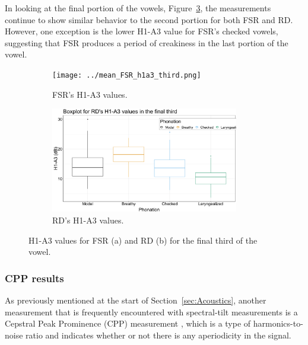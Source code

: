 \documentclass[12pt, letterpaper]{article}
\begin{document}
In looking at the final portion of the vowels, Figure~\ref{fig:h1a3third}, the measurements continue to show similar behavior to the second portion for both FSR and RD. However, one exception is the lower H1-A3 value for FSR's checked vowels, suggesting that FSR produces a period of creakiness in the last portion of the vowel.

\begin{figure}[!ht]
	\centering
	\begin{subfigure}{.5\textwidth}
		\centering
		\texttt{[image: ../mean\_FSR\_h1a3\_third.png]}
		\caption{FSR's H1-A3 values.}
		\label{fig:FSRh1a3third} 
	\end{subfigure}%
	\begin{subfigure}{.5\textwidth}
		\centering
		\includegraphics[width=0.9\textwidth]{../mean_RD_h1a3_third.png}
		\caption{RD's H1-A3 values.}
		\label{fig:RDh1a3third} 
	\end{subfigure}
	\caption{H1-A3 values for FSR (a) and RD (b) for the final third of the vowel. }
	\label{fig:h1a3third}
\end{figure}

\subsubsection{CPP results} \label{sec:CPP}

As previously mentioned at the start of Section~\ref{sec:Acoustics}, another measurement that is frequently encountered with spectral-tilt measurements is a Cepstral Peak Prominence (CPP) measurement \citep{hillenbrandAcousticCorrelatesBreathy1994}, which is a type of harmonics-to-noise ratio and indicates whether or not there is any aperiodicity in the signal. 
\end{document}
